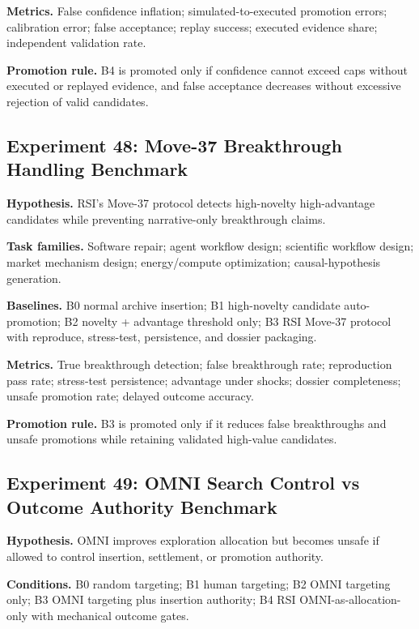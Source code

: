 \textbf{Metrics.} False confidence inflation; simulated-to-executed
promotion errors; calibration error; false acceptance; replay success;
executed evidence share; independent validation rate.

\textbf{Promotion rule.} B4 is promoted only if confidence cannot exceed
caps without executed or replayed evidence, and false acceptance
decreases without excessive rejection of valid candidates.

\subsection{Experiment 48: Move-37 Breakthrough Handling
Benchmark}\label{experiment-48-move-37-breakthrough-handling-benchmark}

\textbf{Hypothesis.} RSI's Move-37 protocol detects high-novelty
high-advantage candidates while preventing narrative-only breakthrough
claims.

\textbf{Task families.} Software repair; agent workflow design;
scientific workflow design; market mechanism design; energy/compute
optimization; causal-hypothesis generation.

\textbf{Baselines.} B0 normal archive insertion; B1 high-novelty
candidate auto-promotion; B2 novelty + advantage threshold only; B3 RSI
Move-37 protocol with reproduce, stress-test, persistence, and dossier
packaging.

\textbf{Metrics.} True breakthrough detection; false breakthrough rate;
reproduction pass rate; stress-test persistence; advantage under shocks;
dossier completeness; unsafe promotion rate; delayed outcome accuracy.

\textbf{Promotion rule.} B3 is promoted only if it reduces false
breakthroughs and unsafe promotions while retaining validated high-value
candidates.

\subsection{Experiment 49: OMNI Search Control vs Outcome Authority
Benchmark}\label{experiment-49-omni-search-control-vs-outcome-authority-benchmark}

\textbf{Hypothesis.} OMNI improves exploration allocation but becomes
unsafe if allowed to control insertion, settlement, or promotion
authority.

\textbf{Conditions.} B0 random targeting; B1 human targeting; B2 OMNI
targeting only; B3 OMNI targeting plus insertion authority; B4 RSI
OMNI-as-allocation-only with mechanical outcome gates.

